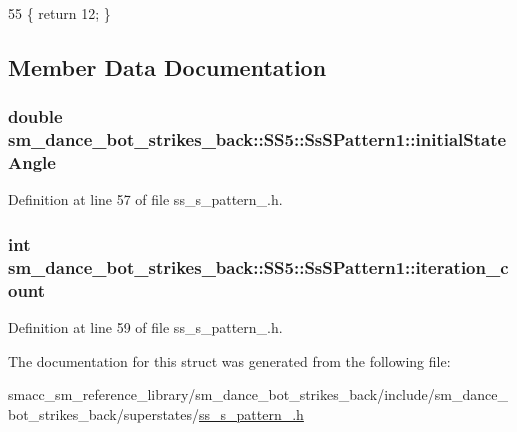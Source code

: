 \begin{DoxyCode}
55 \{ \textcolor{keywordflow}{return} 12; \}
\end{DoxyCode}


\subsection{Member Data Documentation}
\subsubsection[{\texorpdfstring{initial\+State\+Angle}{initialStateAngle}}]{\setlength{\rightskip}{0pt plus 5cm}double sm\+\_\+dance\+\_\+bot\+\_\+strikes\+\_\+back\+::\+S\+S5\+::\+Ss\+S\+Pattern1\+::initial\+State\+Angle}\hypertarget{structsm__dance__bot__strikes__back_1_1SS5_1_1SsSPattern1_a22982e440bf9ff5e8d2893ab30b645b3}{}\label{structsm__dance__bot__strikes__back_1_1SS5_1_1SsSPattern1_a22982e440bf9ff5e8d2893ab30b645b3}


Definition at line 57 of file ss\+\_\+s\+\_\+pattern\+\_.\+h.

\subsubsection[{\texorpdfstring{iteration\+\_\+count}{iteration_count}}]{\setlength{\rightskip}{0pt plus 5cm}int sm\+\_\+dance\+\_\+bot\+\_\+strikes\+\_\+back\+::\+S\+S5\+::\+Ss\+S\+Pattern1\+::iteration\+\_\+count}\hypertarget{structsm__dance__bot__strikes__back_1_1SS5_1_1SsSPattern1_a44964676a99cb2e4db36327c924a5a7d}{}\label{structsm__dance__bot__strikes__back_1_1SS5_1_1SsSPattern1_a44964676a99cb2e4db36327c924a5a7d}


Definition at line 59 of file ss\+\_\+s\+\_\+pattern\+\_.\+h.



The documentation for this struct was generated from the following file\+:\begin{DoxyCompactItemize}
\item 
smacc\+\_\+sm\+\_\+reference\+\_\+library/sm\+\_\+dance\+\_\+bot\+\_\+strikes\+\_\+back/include/sm\+\_\+dance\+\_\+bot\+\_\+strikes\+\_\+back/superstates/\hyperlink{strikes__back_2include_2sm__dance__bot__strikes__back_2superstates_2ss__s__pattern__1_8h}{ss\+\_\+s\+\_\+pattern\+\_.\+h}\end{DoxyCompactItemize}
